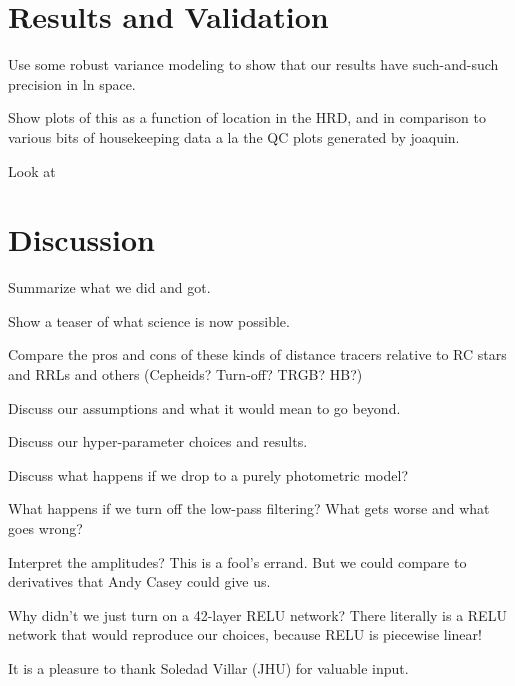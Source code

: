 \documentclass[modern]{aastex631}
\begin{document}
\section{Results and Validation}

Use some robust variance modeling to show that our results have such-and-such precision in ln space.

Show plots of this as a function of location in the HRD, and in comparison to various bits of housekeeping data a la the QC plots generated by joaquin.

Look at 

\section{Discussion}

Summarize what we did and got.

Show a teaser of what science is now possible.

Compare the pros and cons of these kinds of distance tracers relative
to RC stars and RRLs and others (Cepheids? Turn-off? TRGB? HB?)

Discuss our assumptions and what it would mean to go beyond.

Discuss our hyper-parameter choices and results.

Discuss what happens if we drop to a purely photometric model?

What happens if we turn off the low-pass filtering? What gets worse and what goes wrong?

Interpret the amplitudes? This is a fool's errand. But we could compare to derivatives that Andy Casey could give us.

Why didn't we just turn on a 42-layer RELU network? There literally is a RELU network that would reproduce our choices, because RELU is piecewise linear!

\begin{acknowledgements}
It is a pleasure to thank Soledad Villar (JHU) for valuable input.
\end{acknowledgements}



\end{document}
